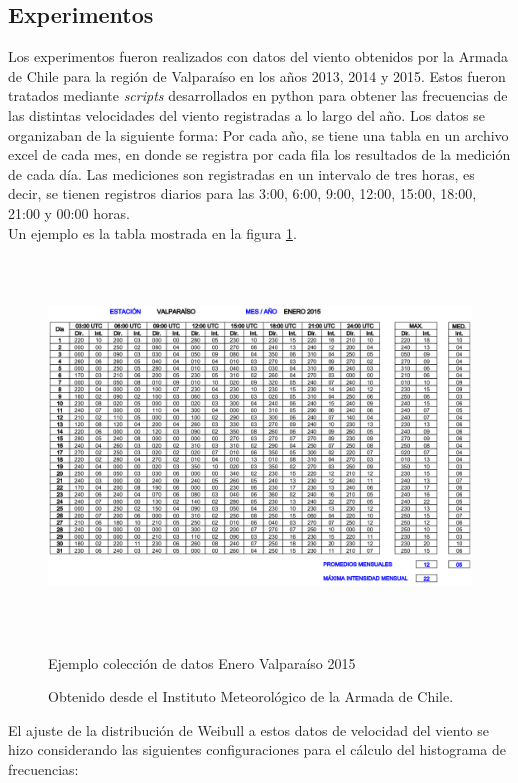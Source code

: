 \subsection{Experimentos}\label{sec:Experimentos_velocidad}
Los experimentos fueron realizados con datos del viento obtenidos por la Armada de Chile para la región de Valparaíso en los años 2013, 2014 y 2015. Estos fueron tratados mediante \emph{scripts} desarrollados en python para obtener las frecuencias de las distintas velocidades del viento registradas a lo largo del año. Los datos se organizaban de la siguiente forma: Por cada año, se tiene una tabla en un archivo excel de cada mes, en donde se registra por cada fila los resultados de la medición de cada día. Las mediciones son registradas en un intervalo de tres horas, es decir, se tienen registros diarios para las 3:00, 6:00, 9:00, 12:00, 15:00, 18:00, 21:00 y 00:00 horas.\\
Un ejemplo es la tabla mostrada en la figura \ref{fig:example_data}.
 \begin{figure}[h!]
    \centering
    \includegraphics[height=100mm]{figures/example_data.png}
    \caption{Ejemplo colección de datos Enero Valparaíso 2015}
    \vspace{-.25cm}
    \caption*{Obtenido desde el Instituto Meteorológico de la Armada de Chile.}
    \label{fig:example_data}
 \end{figure}
El ajuste de la distribución de Weibull a estos datos de velocidad del viento se hizo considerando las siguientes configuraciones para el cálculo del
histograma de frecuencias:
